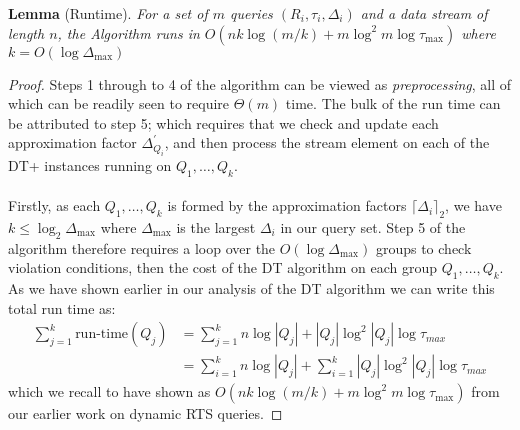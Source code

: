 \textbf{Lemma} (Runtime). \textit{For a set of $m$ queries $(R_i, \tau_i, \Delta_i)$  
 and a data stream of length $n$, the Algorithm runs in $O(nk\log (m/k) + m\log^2 m \log\tau_{\text{max}})$ where $k = O(\log \Delta_{\text{max}})$} 
 \begin{proof}
    Steps 1 through to 4 of the algorithm can be viewed as \textit{preprocessing}, all of which can be readily seen to require $\Theta(m)$ time. The bulk of the run time can be attributed to step 5; which requires that we check and update each approximation factor $\Delta^\prime_{Q_i}$, and then process the stream element on each of the DT+ instances running on $Q_1,\dots, Q_k$. \\
    \\
    Firstly, as each $Q_1,\dots, Q_k$ is formed by the approximation factors $\lceil \Delta_i\rceil_2$, we have $k\leq \log_2\Delta_{\text{max}}$ where $\Delta_{\text{max}}$ is the largest $\Delta_i$ in our query set. Step 5 of the algorithm therefore requires a loop over the $O(\log\Delta_{\text{max}})$ groups to check violation conditions, then the cost of the DT algorithm on each group $Q_1,\dots,Q_k$. As we have shown earlier in our analysis of the DT algorithm we can write this total run time as: 
    \begin{align*}
        \sum_{j=1}^{k}\text{run-time}(Q_{j}) &= \sum_{j=1}^{k} n\log |Q_j| + |Q_j|\log^2 |Q_j| \log\tau_{max} \\
        &= \sum_{i=1}^{k} n\log |Q_j| + \sum_{i=1}^{k}  |Q_j|\log^2 |Q_j| \log\tau_{max} 
    \end{align*}
    which we recall to have shown as $O(nk\log (m/k) + m\log^2 m \log\tau_{\text{max}})$ from our earlier work on dynamic RTS queries.
\end{proof} 

